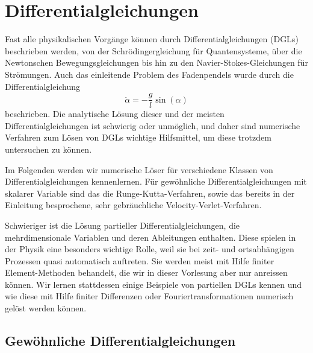 % 

\chapter{Differentialgleichungen}

Fast alle physikalischen Vorgänge können durch Differentialgleichungen
(DGLs) beschrieben werden, von der Schrödingergleichung für
Quantensysteme, über die Newtonschen Bewegungsgleichungen bis hin zu
den Navier-Stokes-Gleichungen für Strömungen. Auch das einleitende
Problem des Fadenpendels wurde durch die Differentialgleichung
\begin{equation}
  \ddot\alpha = -\frac{g}{l}\sin(\alpha)
\end{equation}
beschrieben. Die analytische Lösung dieser und der meisten
Differentialgleichungen ist schwierig oder unmöglich, und daher sind
numerische Verfahren zum Lösen von DGLs wichtige Hilfsmittel, um diese
trotzdem untersuchen zu können.

Im Folgenden werden wir numerische Löser für verschiedene Klassen von
Differentialgleichungen kennenlernen. Für gewöhnliche
Differentialgleichungen mit skalarer Variable sind das die
Runge-Kutta-Verfahren, sowie das bereits in der Einleitung
besprochene, sehr gebräuchliche Velocity-Verlet-Verfahren.

Schwieriger ist die Lösung partieller Differentialgleichungen, die
mehrdimensionale Variablen und deren Ableitungen enthalten.  Diese
spielen in der Physik eine besonders wichtige Rolle, weil sie bei
zeit- und ortsabhängigen Prozessen quasi automatisch auftreten. Sie
werden meist mit Hilfe finiter Element-Methoden behandelt, die wir in
dieser Vorlesung aber nur anreissen können. Wir lernen
stattdessen einige Beispiele von partiellen DGLs kennen und wie diese
mit Hilfe finiter Differenzen oder Fouriertransformationen numerisch
gelöst werden können.

\section{Gewöhnliche Differentialgleichungen}


